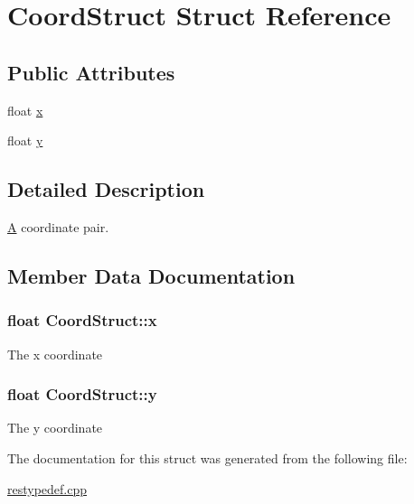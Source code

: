 \hypertarget{structCoordStruct}{\section{Coord\-Struct Struct Reference}
\label{structCoordStruct}
}
\subsection*{Public Attributes}
\begin{DoxyCompactItemize}
\item 
float \hyperlink{structCoordStruct_a183d7226fc5a8470ce9b9f04f9cb69bb}{x}
\item 
float \hyperlink{structCoordStruct_a1a5966a881bc3e76e9becf00639585ac}{y}
\end{DoxyCompactItemize}


\subsection{Detailed Description}
\hyperlink{classA}{A} coordinate pair. 

\subsection{Member Data Documentation}
\hypertarget{structCoordStruct_a183d7226fc5a8470ce9b9f04f9cb69bb}{
\subsubsection[{x}]{\setlength{\rightskip}{0pt plus 5cm}float Coord\-Struct\-::x}}\label{structCoordStruct_a183d7226fc5a8470ce9b9f04f9cb69bb}
The x coordinate \hypertarget{structCoordStruct_a1a5966a881bc3e76e9becf00639585ac}{
\subsubsection[{y}]{\setlength{\rightskip}{0pt plus 5cm}float Coord\-Struct\-::y}}\label{structCoordStruct_a1a5966a881bc3e76e9becf00639585ac}
The y coordinate 

The documentation for this struct was generated from the following file\-:\begin{DoxyCompactItemize}
\item 
\hyperlink{restypedef_8cpp}{restypedef.\-cpp}\end{DoxyCompactItemize}
